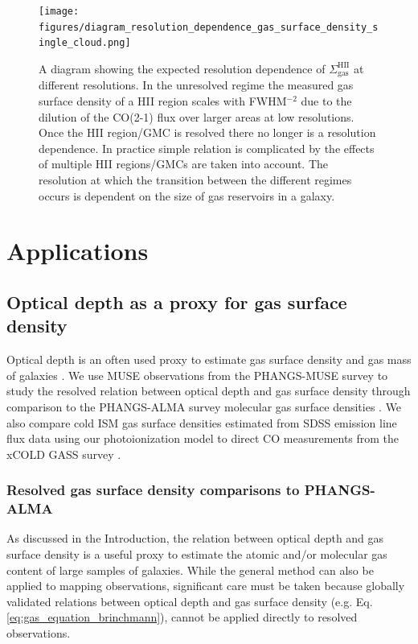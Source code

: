 \documentclass[fleqn,usenatbib]{mnras}
\begin{document}
\begin{figure}
    \centering
    \texttt{[image: figures/diagram\_resolution\_dependence\_gas\_surface\_density\_single\_cloud.png]}
    \caption{A diagram showing the expected resolution dependence of $\Sigma_{\textrm{gas}}^{\textrm{HII}}$ at different resolutions. In the unresolved regime the measured gas surface density of a HII region scales with FWHM$^{-2}$ due to the dilution of the CO(2-1) flux over larger areas at low resolutions. Once the HII region/GMC is resolved there no longer is a resolution dependence. In practice simple relation is complicated by the effects of multiple HII regions/GMCs are taken into account. The resolution at which the transition between the different regimes occurs is dependent on the size of gas reservoirs in a galaxy.}
    \label{fig:diagram_resolution_dependence_gas_cloud}
\end{figure}

\section{Applications}

\subsection{Optical depth as a proxy for gas surface density}
\label{sec:gas_surface_density}
Optical depth is an often used proxy to estimate gas surface density and gas mass of galaxies \citep[e.g.][]{guver2009, heiderman2010, brinchmann2013, concas2019}. We use MUSE observations from the PHANGS-MUSE survey \citep{emsellem2021} to study the resolved relation between optical depth and gas surface density through comparison to the PHANGS-ALMA survey molecular gas surface densities \citep{leroy2021}. We also compare cold ISM gas surface densities estimated from SDSS emission line flux data using our photoionization model to direct CO measurements from the xCOLD GASS survey \citep{saintonge2017}.

\subsubsection{Resolved gas surface density comparisons to PHANGS-ALMA}
As discussed in the Introduction, the relation between optical depth and gas surface density is a useful proxy to estimate the atomic and/or molecular gas content of large samples of galaxies. While the general method can also be applied to mapping  observations, significant care must be taken because globally validated relations between optical depth and gas surface density (e.g.  Eq. \ref{eq:gas_equation_brinchmann}), cannot be applied directly to resolved observations.
\end{document}

